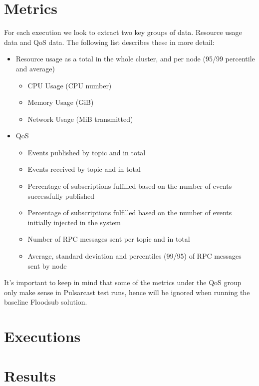 \section{Metrics}\label{metrics}

For each execution we look to extract two key groups of data. Resource usage
data and QoS data. The following list describes these in more detail:

\begin{itemize}
  \item Resource usage as a total in the whole cluster, and per node (95/99
  percentile and average)
  \begin{itemize}
    \item CPU Usage (CPU number)
    \item Memory Usage (GiB)
    \item Network Usage (MiB transmitted)
  \end{itemize}
  \item QoS
  \begin{itemize}
    \item Events published by topic and in total
    \item Events received by topic and in total
    \item Percentage of subscriptions fulfilled based on the number of events
    successfully published
    \item Percentage of subscriptions fulfilled based on the number of events
    initially injected in the system
    \item Number of RPC messages sent per topic and in total
    \item Average, standard deviation and percentiles (99/95) of RPC messages
    sent by node
  \end{itemize}
\end{itemize}

It's important to keep in mind that some of the metrics under the QoS group
only make sense in Pulsarcast test runs, hence will be ignored when running the
baseline Floodsub solution.

\section{Executions}\label{executions}

\section{Results}\label{results}
